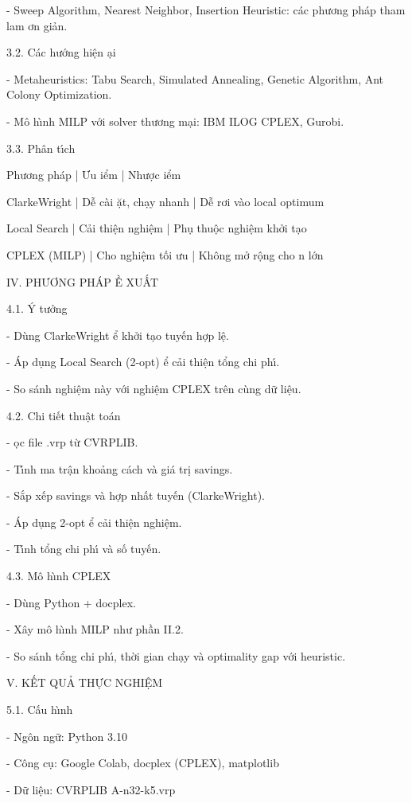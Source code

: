 \documentclass[12pt]{article}
\begin{document}
- Sweep Algorithm, Nearest Neighbor, Insertion Heuristic: c\'ac phương ph\'ap tham lam {\dj}ơn giản.

3.2. C\'ac hướng hiện {\dj}ại

- Metaheuristics: Tabu Search, Simulated Annealing, Genetic Algorithm, Ant Colony Optimization.

- M\^o h{\`\i}nh MILP với solver thương mại: IBM ILOG CPLEX, Gurobi.

3.3. Ph\^an t{\'\i}ch

Phương ph\'ap | Ưu {\dj}iểm | Nhược {\dj}iểm

Clarke{\textendash}Wright | Dễ c\`ai {\dj}ặt, chạy nhanh | Dễ rơi v\`ao local optimum

Local Search | Cải thiện nghiệm | Phụ thuộc nghiệm khởi tạo

CPLEX (MILP) | Cho nghiệm tối ưu | Kh\^ong mở rộng cho n lớn

IV. PHƯƠNG PH\'AP {\DJ}Ề XUẤT

4.1. \'Y tưởng

- D\`ung Clarke{\textendash}Wright {\dj}ể khởi tạo tuyến hợp lệ.

- \'Ap dụng Local Search (2-opt) {\dj}ể cải thiện tổng chi ph{\'\i}.

- So s\'anh nghiệm n\`ay với nghiệm CPLEX tr\^en c\`ung dữ liệu.

4.2. Chi tiết thuật to\'an

- {\DJ}ọc file .vrp từ CVRPLIB.

- T{\'\i}nh ma trận khoảng c\'ach v\`a gi\'a trị savings.

- Sắp xếp savings v\`a hợp nhất tuyến (Clarke{\textendash}Wright).

- \'Ap dụng 2-opt {\dj}ể cải thiện nghiệm.

- T{\'\i}nh tổng chi ph{\'\i} v\`a số tuyến.

4.3. M\^o h{\`\i}nh CPLEX

- D\`ung Python + docplex.

- X\^ay m\^o h{\`\i}nh MILP như phần II.2.

- So s\'anh tổng chi ph{\'\i}, thời gian chạy v\`a optimality gap với heuristic.

V. KẾT QUẢ THỰC NGHIỆM

5.1. Cấu h{\`\i}nh

- Ng\^on ngữ: Python 3.10

- C\^ong cụ: Google Colab, docplex (CPLEX), matplotlib

- Dữ liệu: CVRPLIB {\textendash} A-n32-k5.vrp
\end{document}
